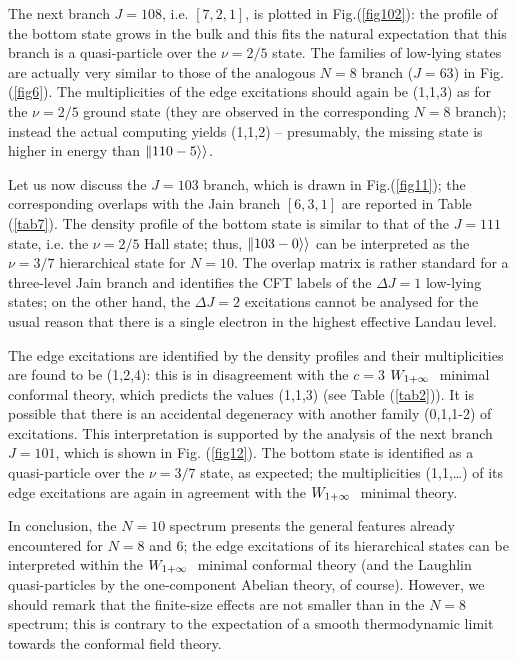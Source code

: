 The next branch $J=108$, i.e. $[7,2,1]$, is plotted in Fig.(\ref{fig102}):
the profile of the bottom state grows in the bulk 
and this fits the natural expectation that
this branch is a quasi-particle over the $\nu=2/5$ state.
The families of low-lying states are actually
very similar to those of the analogous $N=8$ branch ($J=63$) 
in Fig.(\ref{fig6}).
The multiplicities of the edge excitations should again be (1,1,3) 
as for the $\nu=2/5$ ground state (they are observed in the 
corresponding $N=8$ branch); 
instead the actual computing yields (1,1,2) -- presumably, the missing state
is higher in energy than $\Vert 110-5 \rangle\rangle$.

Let us now discuss the $J=103$ branch, which is drawn in Fig.(\ref{fig11});
the corresponding overlaps with the Jain branch $[6,3,1]$ 
are reported in Table (\ref{tab7}).
The density profile of the bottom state is similar to
that of the $J=111$ state, i.e. 
the $\nu=2/5$ Hall state; thus, $\Vert 103-0\rangle\rangle$ can be interpreted as
the $\nu=3/7$ hierarchical state for $N=10$.
The overlap matrix is rather standard for a three-level Jain
branch and identifies the CFT labels of the $\Delta J=1$ low-lying
states; on the other hand, the $\Delta J=2$ excitations 
cannot be analysed for the usual
reason that there is a single electron in the highest effective Landau level. 

The edge excitations are identified by the density profiles and
 their multiplicities are found to be
(1,2,4): this is in disagreement with the 
$c=3$ $W_{1+\infty}\ $ minimal conformal theory, which predicts the values
(1,1,3) (see Table (\ref{tab2})).
It is possible that there is an accidental degeneracy with another family
(0,1,1-2) of excitations. This interpretation is supported by
the analysis of the next branch $J=101$, which is shown in Fig. (\ref{fig12}).
The bottom state is identified as a quasi-particle over
the $\nu=3/7$ state, as expected; the multiplicities (1,1,\dots) of 
its edge excitations are again in agreement with the $W_{1+\infty}\ $ minimal theory.

In conclusion, the $N=10$ spectrum presents the general features already
encountered for $N=8$ and $6$; the edge excitations of its hierarchical states 
can be interpreted within
the $W_{1+\infty}\ $ minimal conformal theory (and the Laughlin quasi-particles
by the one-component Abelian theory, of course).
However, we should remark that the finite-size effects are not
smaller than in the $N=8$ spectrum; this is contrary to the expectation
of a smooth thermodynamic limit towards the conformal field theory.

